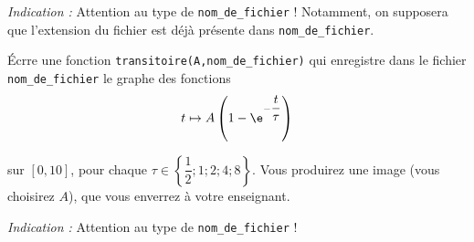 \emph{Indication :} Attention au type de \texttt{nom\_de\_fichier} ! Notamment, on supposera que l'extension du fichier est déjà présente dans \texttt{nom\_de\_fichier}.

\medskip{}

\questioni{}%
 \'Ecrre une fonction \texttt{transitoire(A,nom\_de\_fichier)} qui enregistre dans le fichier \texttt{nom\_de\_fichier} le graphe des fonctions 
\begin{equation*}
  t\mapsto A\left({1-\e^{-\dfrac{t}{\tau}}}\right)
\end{equation*}


sur $[0,10]$, pour chaque $\tau\in\left\{\dfrac{1}{2};1;2;4;8\right\}$. 
Vous produirez une image (vous choisirez $A$), que vous enverrez à votre enseignant. 

\emph{Indication :} Attention au type de \texttt{nom\_de\_fichier} !